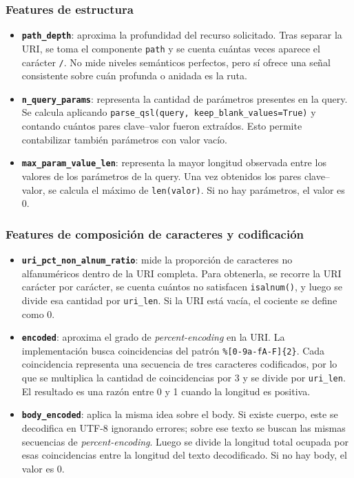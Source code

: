 \documentclass[12pt,oneside]{report}
\begin{document}
\subsubsection{Features de estructura}
\begin{itemize}[leftmargin=*]
  \item \textbf{\texttt{path\_depth}}: aproxima la profundidad del recurso solicitado. Tras separar la URI, se toma el componente \texttt{path} y se cuenta cuántas veces aparece el carácter \texttt{/}. No mide niveles semánticos perfectos, pero sí ofrece una señal consistente sobre cuán profunda o anidada es la ruta.

  \item \textbf{\texttt{n\_query\_params}}: representa la cantidad de parámetros presentes en la query. Se calcula aplicando \texttt{parse\_qsl(query, keep\_blank\_values=True)} y contando cuántos pares clave--valor fueron extraídos. Esto permite contabilizar también parámetros con valor vacío.

  \item \textbf{\texttt{max\_param\_value\_len}}: representa la mayor longitud observada entre los valores de los parámetros de la query. Una vez obtenidos los pares clave--valor, se calcula el máximo de \texttt{len(valor)}. Si no hay parámetros, el valor es 0.
\end{itemize}

\subsubsection{Features de composición de caracteres y codificación}
\begin{itemize}[leftmargin=*]
  \item \textbf{\texttt{uri\_pct\_non\_alnum\_ratio}}: mide la proporción de caracteres no alfanuméricos dentro de la URI completa. Para obtenerla, se recorre la URI carácter por carácter, se cuenta cuántos no satisfacen \texttt{isalnum()}, y luego se divide esa cantidad por \texttt{uri\_len}. Si la URI está vacía, el cociente se define como 0.

  \item \textbf{\texttt{encoded}}: aproxima el grado de \textit{percent-encoding} en la URI. La implementación busca coincidencias del patrón \texttt{\%[0-9a-fA-F]\{2\}}. Cada coincidencia representa una secuencia de tres caracteres codificados, por lo que se multiplica la cantidad de coincidencias por 3 y se divide por \texttt{uri\_len}. El resultado es una razón entre 0 y 1 cuando la longitud es positiva.

  \item \textbf{\texttt{body\_encoded}}: aplica la misma idea sobre el body. Si existe cuerpo, este se decodifica en UTF-8 ignorando errores; sobre ese texto se buscan las mismas secuencias de \textit{percent-encoding}. Luego se divide la longitud total ocupada por esas coincidencias entre la longitud del texto decodificado. Si no hay body, el valor es 0.
\end{itemize}
\end{document}
